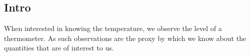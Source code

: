 \begin{bibunit}
%
%
%
%
%
%

  \section{Intro}
When interested in knowing the temperature, we observe the level of a thermometer.
As such observations are the proxy by which we know about the quantities that are of interest to us. 


\end{bibunit}
